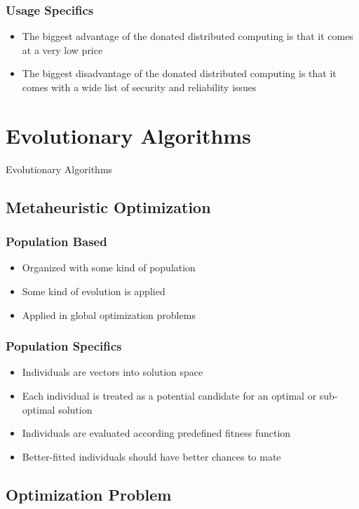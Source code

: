 \documentclass{beamer}
\begin{document}
\begin{frame}
\frametitle{Usage Specifics}
\begin{itemize}
	\item The biggest advantage of the donated distributed computing is that it comes at a very low price
	\item The biggest disadvantage of the donated distributed computing is that it comes with a wide list of security and reliability issues
\end{itemize}
\end{frame}

\section{Evolutionary Algorithms}

\begin{frame}
\center \huge{Evolutionary Algorithms}
\end{frame}

\subsection{Metaheuristic Optimization}

\begin{frame}
\frametitle{Population Based}
\begin{itemize}
	\item Organized with some kind of population
	\item Some kind of evolution is applied
	\item Applied in global optimization problems
\end{itemize}
\end{frame}

\begin{frame}
\frametitle{Population Specifics}
\begin{itemize}
	\item Individuals are vectors into solution space
	\item Each individual is treated as a potential candidate for an optimal or sub-optimal solution
	\item Individuals are evaluated according predefined fitness function
	\item Better-fitted individuals should have better chances to mate
\end{itemize}
\end{frame}

\subsection{Optimization Problem}
\end{document}
